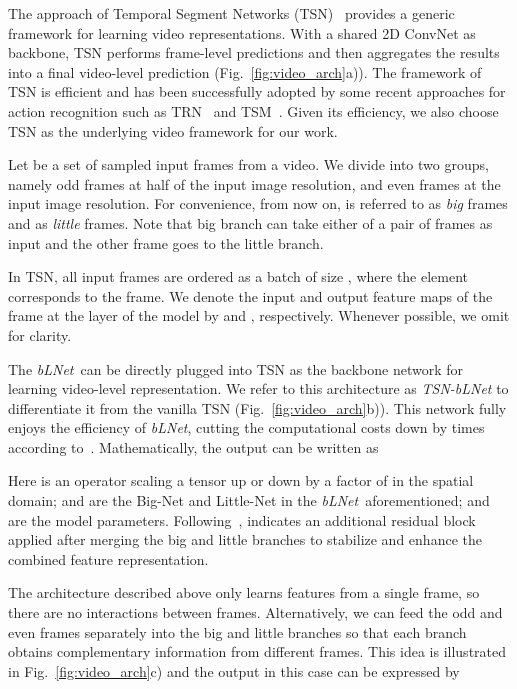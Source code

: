 \documentclass{article}
\def\blnet{\textit{bLNet}\xspace}
\def\blvnet{\textit{TSN-bLNet}\xspace}
\begin{document}
The approach of Temporal Segment Networks (TSN)~\cite{TSN:wang2016temporal} provides a generic framework for learning video representations. With a shared 2D ConvNet as backbone, TSN performs frame-level predictions and then aggregates the results into a final video-level prediction (Fig.~\ref{fig:video_arch}a)).
The framework of TSN is efficient and has been successfully adopted by some recent approaches for action recognition such as TRN~\cite{TRN:zhou2018temporal} and TSM~\cite{TSM:lin2018temporal}.
Given its efficiency, we also choose TSN as the underlying video framework for our work. 


Let  be a set of sampled input frames from a video. We divide  into two groups, namely odd frames  at half of the input image resolution, and even frames  at the input image resolution. For convenience, from now on,  is referred to as \textit{big} frames and  as \textit{little} frames. Note that big branch can take either of a pair of frames as input and the other frame goes to the little branch.

In TSN, all input frames are ordered as a batch of size , where the  element corresponds to the  frame.
We denote the input and output feature maps of the  frame at the  layer of the model by  and , respectively. Whenever possible, we omit  for clarity.

The \blnet~can be directly plugged into TSN as the backbone network for learning video-level representation. We refer to this architecture as \blvnet to differentiate it from the vanilla TSN (Fig.~\ref{fig:video_arch}b)). 
This network fully enjoys the efficiency of \blnet, cutting the computational costs down by  times according to~\cite{chen2018biglittle}. Mathematically, the output  can be written as

Here  is an operator scaling a tensor up or down by a factor of  in the spatial domain;  and  are the Big-Net and Little-Net in the \blnet~aforementioned; and  are the model parameters. Following~\cite{chen2018biglittle},  indicates an additional residual block applied after merging the big and little branches to stabilize and enhance the combined feature representation.

The architecture described above only learns features from a single frame, so there are no interactions between frames. Alternatively, we can feed the odd and even frames separately into the big and little branches so that each branch obtains complementary information from different frames. This idea is illustrated in Fig.~\ref{fig:video_arch}c) and the output  in this case can be expressed by
\end{document}
